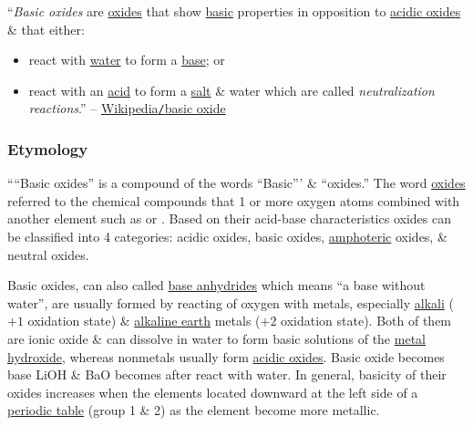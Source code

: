 \documentclass{article}
\begin{document}
``\textit{Basic oxides} are \href{https://en.wikipedia.org/wiki/Oxide}{oxides} that show \href{https://en.wikipedia.org/wiki/Base_(chemistry)}{basic} properties in opposition to \href{https://en.wikipedia.org/wiki/Acidic_oxide}{acidic oxides} \& that either:
\begin{itemize}
	\item react with \href{https://en.wikipedia.org/wiki/Water}{water} to form a \href{https://en.wikipedia.org/wiki/Base_(chemistry)}{base}; or
	\item react with an \href{https://en.wikipedia.org/wiki/Acid}{acid} to form a \href{https://en.wikipedia.org/wiki/Salt_(chemistry)}{salt} \& water which are called \textit{neutralization reactions}.'' -- \href{https://en.wikipedia.org/wiki/Basic_oxide}{Wikipedia{\tt/}basic oxide}
\end{itemize}

\subsubsection{Etymology}
````Basic oxides'' is a compound of the words ``Basic''' \& ``oxides.'' The word \href{https://en.wikipedia.org/wiki/Oxide}{oxides} referred to the chemical compounds that 1 or more oxygen atoms combined with another element such as  or . Based on their acid-base characteristics oxides can be classified into 4 categories: acidic oxides, basic oxides, \href{https://en.wikipedia.org/wiki/Amphoteric}{amphoteric} oxides, \& neutral oxides.

Basic oxides, can also called \href{https://en.wikipedia.org/wiki/Base_anhydride}{base anhydrides} which means ``a base without water'', are usually formed by reacting of oxygen with metals, especially \href{https://en.wikipedia.org/wiki/Alkali_metals}{alkali} ($+1$ oxidation state) \& \href{https://en.wikipedia.org/wiki/Alkaline_earth_metals}{alkaline earth} metals ($+2$ oxidation state). Both of them are ionic oxide \& can dissolve in water to form basic solutions of the \href{https://en.wikipedia.org/wiki/Metal_hydroxide}{metal hydroxide}, whereas nonmetals usually form \href{https://en.wikipedia.org/wiki/Acidic_oxide}{acidic oxides}. Basic oxide  becomes base LiOH \& BaO becomes  after react with water. In general, basicity of their oxides increases when the elements located downward at the left side of a \href{https://en.wikipedia.org/wiki/Periodic_table}{periodic table} (group 1 \& 2) as the element become more metallic.
\end{document}
